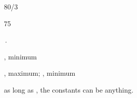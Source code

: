 {\begin{two-digit-list}
\item [14.] 80/3

\item [15.] 75

\item [17.] 

\item [18.] \,.

\item [19.] \NullItem
\begin{one-digit-list}
\item [a.] , minimum
\item [b.] , maximum; , minimum
\item [c.] as long as , the constants can be anything.  
\end{one-digit-list}
\end{two-digit-list}

} %

